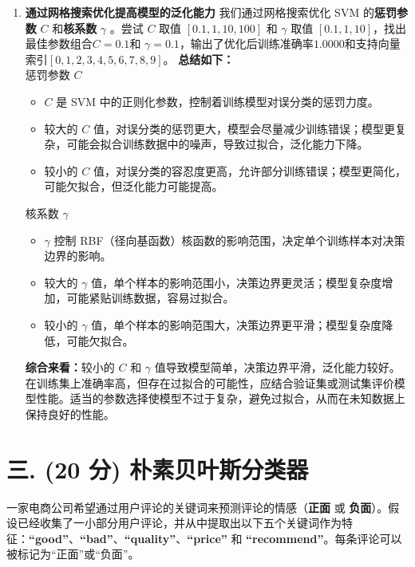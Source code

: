 \documentclass[8pt]{article}
\begin{document}
\begin{enumerate}
    \item \textbf{通过网格搜索优化提高模型的泛化能力} 
    我们通过网格搜索优化 SVM 的\textbf{惩罚参数} \(C\) 和\textbf{核系数} \( \gamma \) 。尝试 \( C \) 取值 \([0.1, 1, 10, 100]\) 和 \( \gamma \) 取值 \([0.1, 1, 10]\)，找出最佳参数组合\( C = 0.1 \)和 \( \gamma  = 0.1\)，输出了优化后训练准确率\(1.0000\)和支持向量索引\([0, 1, 2, 3, 4, 5, 6, 7, 8, 9]\)。
    \textbf{总结如下：} \\
    惩罚参数 \(C\)
    \begin{itemize} 
        \item \(C\) 是 SVM 中的正则化参数，控制着训练模型对误分类的惩罚力度。
        \item 较大的 \(C\) 值，对误分类的惩罚更大，模型会尽量减少训练错误；模型更复杂，可能会拟合训练数据中的噪声，导致过拟合，泛化能力下降。
        \item 较小的 \(C\) 值，对误分类的容忍度更高，允许部分训练错误；模型更简化，可能欠拟合，但泛化能力可能提高。
    \end{itemize}
    核系数 \(\gamma\)
    \begin{itemize} 
        \item \(\gamma\) 控制 RBF（径向基函数）核函数的影响范围，决定单个训练样本对决策边界的影响。
        \item 较大的 \(\gamma\) 值，单个样本的影响范围小，决策边界更灵活；模型复杂度增加，可能紧贴训练数据，容易过拟合。
        \item 较小的 \(\gamma\) 值，单个样本的影响范围大，决策边界更平滑；模型复杂度降低，可能欠拟合。
    \end{itemize}
    \textbf{综合来看：}较小的 \(C\) 和 \(\gamma\) 值导致模型简单，决策边界平滑，泛化能力较好。在训练集上准确率高，但存在过拟合的可能性，应结合验证集或测试集评价模型性能。适当的参数选择使模型不过于复杂，避免过拟合，从而在未知数据上保持良好的性能。
\end{enumerate}

\vspace{3em}

\section*{三. (20 分) 朴素贝叶斯分类器}
一家电商公司希望通过用户评论的关键词来预测评论的情感（\textbf{正面} 或 \textbf{负面}）。假设已经收集了一小部分用户评论，并从中提取出以下五个关键词作为特征：\textbf{“good”}、\textbf{“bad”}、\textbf{“quality”}、\textbf{“price”} 和 \textbf{“recommend”}。每条评论可以被标记为“正面”或“负面”。
\end{document}
